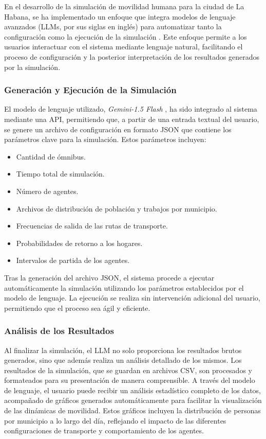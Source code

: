 \documentclass[a4paper,12pt]{article}
\begin{document}
En el desarrollo de la simulación de movilidad humana para la ciudad de La Habana, se ha implementado un enfoque que integra modelos de lenguaje avanzados (LLMs, por sus siglas en inglés) para automatizar tanto la configuración como la ejecución de la simulación \cite{llm_overview}. Este enfoque permite a los usuarios interactuar con el sistema mediante lenguaje natural, facilitando el proceso de configuración y la posterior interpretación de los resultados generados por la simulación.

\subsubsection{Generación y Ejecución de la Simulación}

El modelo de lenguaje utilizado, \textit{Gemini-1.5 Flash} \cite{gemini_model}, ha sido integrado al sistema mediante una API, permitiendo que, a partir de una entrada textual del usuario, se genere un archivo de configuración en formato JSON que contiene los parámetros clave para la simulación. Estos parámetros incluyen:

\begin{itemize}
    \item Cantidad de ómnibus.
    \item Tiempo total de simulación.
    \item Número de agentes.
    \item Archivos de distribución de población y trabajos por municipio.
    \item Frecuencias de salida de las rutas de transporte.
    \item Probabilidades de retorno a los hogares.
    \item Intervalos de partida de los agentes.
\end{itemize}

Tras la generación del archivo JSON, el sistema procede a ejecutar automáticamente la simulación utilizando los parámetros establecidos por el modelo de lenguaje. La ejecución se realiza sin intervención adicional del usuario, permitiendo que el proceso sea ágil y eficiente.

\subsubsection{Análisis de los Resultados}

Al finalizar la simulación, el LLM no solo proporciona los resultados brutos generados, sino que además realiza un análisis detallado de los mismos. Los resultados de la simulación, que se guardan en archivos CSV, son procesados y formateados para su presentación de manera comprensible. A través del modelo de lenguaje, el usuario puede recibir un análisis estadístico completo de los datos, acompañado de gráficos generados automáticamente para facilitar la visualización de las dinámicas de movilidad. Estos gráficos incluyen la distribución de personas por municipio a lo largo del día, reflejando el impacto de las diferentes configuraciones de transporte y comportamiento de los agentes.
\end{document}

